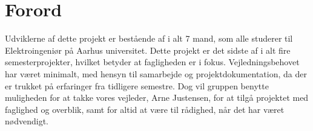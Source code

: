 \chapter{Forord}
\label{ch:Forord}

Udviklerne af dette projekt er bestående af i alt 7 mand, som alle studerer til Elektroingeniør på Aarhus universitet. 
Dette projekt er det sidste af i alt fire semesterprojekter, hvilket betyder at fagligheden er i fokus. 
Vejledningsbehovet har været minimalt, med hensyn til samarbejde og projektdokumentation, da der er trukket på erfaringer fra tidligere semestre. 
Dog vil gruppen benytte muligheden for at takke vores vejleder, Arne Justensen, for at tilgå projektet med faglighed og overblik, samt for altid at være til rådighed, når det har været nødvendigt.  
\clearpage